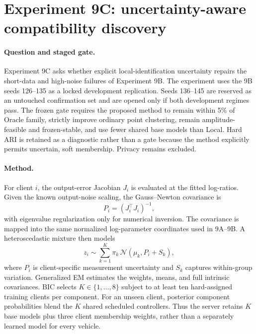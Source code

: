 \section{Experiment 9C: uncertainty-aware compatibility discovery}
\label{sec:experiment9c}

\paragraph{Question and staged gate.}
Experiment 9C asks whether explicit local-identification uncertainty repairs the
short-data and high-noise failures of Experiment 9B. The experiment uses the 9B
seeds 126--135 as a locked development replication. Seeds 136--145 are reserved
as an untouched confirmation set and are opened only if both development
regimes pass. The frozen gate requires the proposed method to remain within 5\%
of Oracle family, strictly improve ordinary point clustering, remain amplitude-
feasible and frozen-stable, and use fewer shared base models than Local. Hard
ARI is retained as a diagnostic rather than a gate because the method explicitly
permits uncertain, soft membership. Privacy remains excluded.

\paragraph{Method.}
For client $i$, the output-error Jacobian $J_i$ is evaluated at the fitted
log-ratios. Given the known output-noise scaling, the Gauss--Newton covariance is
\begin{equation}
 P_i = (J_i^\top J_i)^{-1},
\end{equation}
with eigenvalue regularization only for numerical inversion. The covariance is
mapped into the same normalized log-parameter coordinates used in 9A--9B. A
heteroscedastic mixture then models
\begin{equation}
 z_i \sim \sum_{k=1}^{K}\pi_k\,
 \mathcal{N}(\mu_k,P_i+S_k),
\end{equation}
where $P_i$ is client-specific measurement uncertainty and $S_k$ captures
within-group variation. Generalized EM estimates the weights, means, and full
intrinsic covariances. BIC selects $K\in\{1,\ldots,8\}$ subject to at least ten
hard-assigned training clients per component. For an unseen client, posterior
component probabilities blend the $K$ shared scheduled controllers. Thus the
server retains $K$ base models plus three client membership weights, rather than
a separately learned model for every vehicle.

